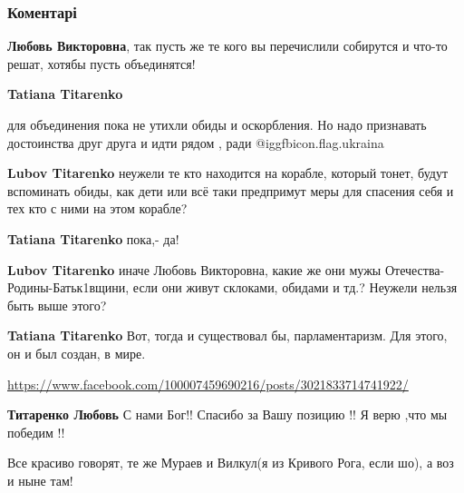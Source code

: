  
 
 
 
 
\subsubsection{Коментарі}
\label{sec:06_10_2021.fb.titarenko_lubov.1.strana_sudjba.cmt}

\begin{itemize} %
\textbf{Любовь Викторовна}, так пусть же те кого вы перечислили собирутся и что-то решат, хотябы пусть объединятся!

\begin{itemize} %
\textbf{Tatiana Titarenko} 

для объединения пока не утихли обиды и оскорбления. Но надо признавать
достоинства друг друга и идти рядом , ради @igg{fbicon.flag.ukraina}


\textbf{Lubov Titarenko} неужели те кто находится на корабле, который тонет, будут вспоминать обиды, как дети или всё таки предпримут меры для спасения себя и тех кто с ними на этом корабле?

\textbf{Tatiana Titarenko} пока,- да!

\textbf{Lubov Titarenko} иначе Любовь Викторовна, какие же они мужы Отечества-Родины-Батьк1вщини, если они живут склоками, обидами и тд.? Неужели нельзя быть выше этого?

\textbf{Tatiana Titarenko} Вот, тогда и существовал бы, парламентаризм. Для этого, он и был создан, в мире.
\end{itemize} %

\url{https://www.facebook.com/100007459690216/posts/3021833714741922/}

\begin{itemize} %
\textbf{Титаренко Любовь} С нами Бог!! Спасибо за Вашу позицию !! Я верю ,что мы победим !!
\end{itemize} %

Все красиво говорят, те же Мураев и Вилкул(я из Кривого Рога, если шо), а воз и ныне там!


\end{itemize}
